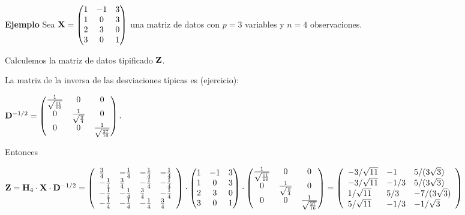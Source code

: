 \begin{frame}
\textbf{Ejemplo} 
Sea $\mathbf{X}=\begin{pmatrix}
1&-1&3\\
1&0&3\\
2&3&0\\
3&0&1
\end{pmatrix}$
una matriz de datos con $p=3$ variables y $n=4$ observaciones.

Calculemos la matriz de datos tipificado $\mathbf{Z}$.

La matriz de la inversa de las desviaciones típicas es (ejercicio):

$\mathbf{D}^{-1/2}=
\begin{pmatrix}
\frac{1}{\sqrt{\frac{11}{16}}} & 0                  & 0 \\
0                             & \frac{1}{\sqrt{\frac{9}{4}}}& 0\\
0                             & 0 &\frac{1}{\sqrt{\frac{27}{16}}}  
\end{pmatrix}.$

Entonces 

\end{frame}
\begin{frame}

$\mathbf{Z}= \mathbf{H}_4\cdot \mathbf{X} \cdot  \mathbf{D}^{-1/2}= \left(
\begin{array}{llll}
 \frac{3}{4} & -\frac{1}{4} & -\frac{1}{4} &
   -\frac{1}{4} \\
 -\frac{1}{4} & \frac{3}{4} & -\frac{1}{4} &
   -\frac{1}{4} \\
 -\frac{1}{4} & -\frac{1}{4} & \frac{3}{4} &
   -\frac{1}{4} \\
 -\frac{1}{4} & -\frac{1}{4} & -\frac{1}{4} &
   \frac{3}{4}
\end{array}
\right) \cdot 
\begin{pmatrix}
1&-1&3\\
1&0&3\\
2&3&0\\
3&0&1
\end{pmatrix}
\cdot \begin{pmatrix}\frac{1}{\sqrt{\frac{11}{16}}} & 0 & 0 \\
0 & \frac{1}{\sqrt{\frac{9}{4}}}& 0\\
0 &  0 &\frac{1}{\sqrt{\frac{27}{16}}}
\end{pmatrix}=
\left(
\begin{array}{lll}
 -{3}/{\sqrt{11}} & -1 & {5}/({3 \sqrt{3}}) \\
 -{3}/{\sqrt{11}} & -{1}/{3} & {5}/({3 \sqrt{3}}) \\
 {1}/{\sqrt{11}} & {5}/{3} & -{7}/({3 \sqrt{3}}) \\
 {5}/{\sqrt{11}} & -{1}/{3} & -{1}/{\sqrt{3}}
\end{array}
\right)
$



\end{frame}

